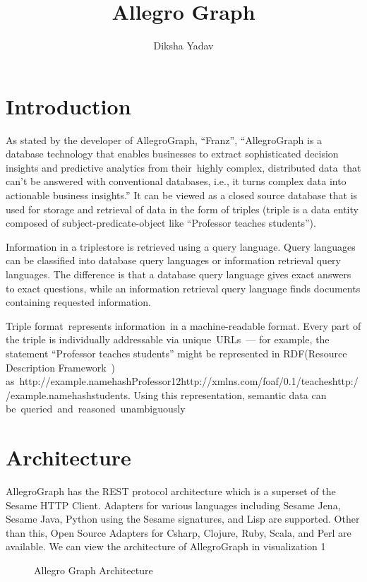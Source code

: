 \documentclass[9pt,twocolumn,twoside]{styles/osajnl}
\title{Allegro Graph}
\author[1,*, +]{Diksha Yadav}
\affil[1]{School of Informatics and Computing, Bloomington, IN 47408, U.S.A.}
\affil[*]{Corresponding authors: yadavd@umail.iu.edu}
\affil[+]{HID - S17-IR-2044}
\begin{document}
\maketitle

\section{Introduction}
As stated by the developer of AllegroGraph, “Franz”, “AllegroGraph is a database technology that enables businesses to extract sophisticated decision insights and predictive analytics from their highly complex, distributed data that can’t be answered with conventional databases, i.e., it turns complex data into actionable business insights.” \cite{fag}
It can be viewed as a closed source database that is used for storage and retrieval of data in the form of triples (triple is a data entity composed of subject-predicate-object like “Professor teaches students”). 

Information in a triplestore is retrieved using a query language. Query languages can be classified into database query languages or information retrieval query languages. The difference is that a database query language gives exact answers to exact questions, while an information retrieval query language finds documents containing requested information. \cite{wag}

Triple format represents information in a machine-readable format. Every part of the triple is individually addressable via unique URLs — for example, the statement “Professor teaches students” might be represented in RDF(Resource Description Framework ) as http://example.namehashProfessor12http://xmlns.com/foaf/0.1/teacheshttp://example.namehashstudents. Using this representation, semantic data can be queried and reasoned unambiguously \cite{str}

\section{Architecture}
AllegroGraph has the REST protocol architecture which is a superset of the Sesame HTTP Client. Adapters for various languages including Sesame Jena, Sesame Java, Python using the Sesame signatures, and Lisp are supported. Other than this, Open Source Adapters for Csharp, Clojure, Ruby, Scala, and Perl are available. We can view the architecture of AllegroGraph in visualization 1 \cite{fag}

\begin{figure}[htbp]
	\centering
	\caption{Allegro Graph Architecture}
	\label{fig:Allegro-arch}
\end{figure}
\end{document}
